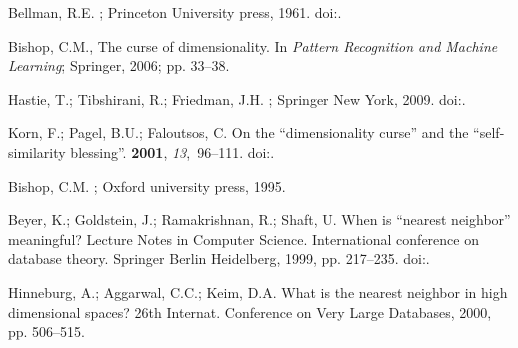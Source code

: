 \documentclass[entropy,article,submit,moreauthors,pdftex]{Definitions/mdpi}
\begin{document}

%

\begin{thebibliography}{-------}
\providecommand{\natexlab}[1]{#1}

Bellman, R.E.
; Princeton
  {U}niversity press,  1961.
\newblock
  doi:{\href{https://doi.org/10.1515/9781400874668}{}}.

Bishop, C.M., The curse of dimensionality.
\newblock In {\em Pattern Recognition and Machine Learning}; Springer,  2006;
  pp. 33--38.

Hastie, T.; Tibshirani, R.; Friedman, J.H.
; Springer New York,  2009.
\newblock
  doi:{\href{https://doi.org/10.1007/978-0-387-84858-7}{}}.

Korn, F.; Pagel, B.U.; Faloutsos, C.
\newblock On the ``dimensionality curse'' and the ``self-similarity blessing''.
 {\bf 2001}, {\em 13},~96--111.
\newblock
  doi:{\href{https://doi.org/10.1109/69.908983}{}}.

Bishop, C.M.
; Oxford university
  press,  1995.

Beyer, K.; Goldstein, J.; Ramakrishnan, R.; Shaft, U.
\newblock When is ``nearest neighbor'' meaningful?
\newblock  Lecture Notes in Computer Science. International conference on
  database theory. Springer Berlin Heidelberg,  1999, pp. 217--235.
\newblock
  doi:{\href{https://doi.org/10.1007/3-540-49257-7_15}{}}.

Hinneburg, A.; Aggarwal, C.C.; Keim, D.A.
\newblock What is the nearest neighbor in high dimensional spaces?
\newblock  26th Internat. Conference on Very Large Databases,  2000, pp.
  506--515.


\end{thebibliography}
\end{document}
